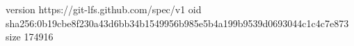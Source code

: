 version https://git-lfs.github.com/spec/v1
oid sha256:0b19cbe8f230a43d6bb34b1549956b985e5b4a199b9539d0693044c1c4c7e873
size 174916
